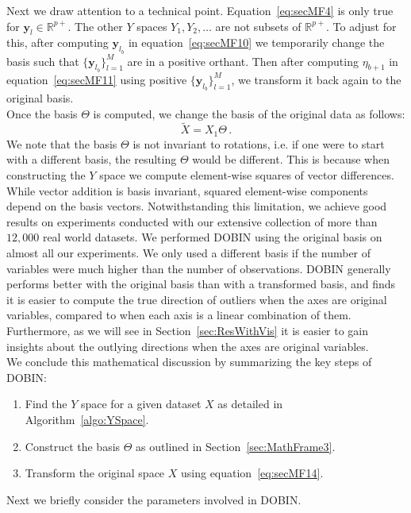 \documentclass[11pt]{article}
\begin{document}
Next we draw attention to a technical point. Equation~\ref{eq:secMF4} is only true for  $\bm{y}_l \in \mathbb{R}^{p+}$. The other $Y$ spaces $Y_1, Y_2, \ldots $ are not  subsets of $\mathbb{R}^{p+}$. To adjust for this, after computing  $\bm{y}_{l_{b}}$ in equation~\eqref{eq:secMF10} we temporarily change the basis such that  $\{ \bm{y}_{l_{b}}\}_{l=1}^M$ are in a positive orthant.  Then after computing  $\eta_{b+1}$ in equation~\eqref{eq:secMF11} using positive $\{ \bm{y}_{l_{b}}\}_{l=1}^M$,  we transform it back again to the original basis.  \\

Once the basis $\Theta$  is computed, we  change the basis of the original data as follows:
\begin{equation}\label{eq:secMF14}
    \tilde{X} = X_1 \Theta \, .
\end{equation}
We note that the basis $\Theta$ is not invariant to rotations, i.e. if one were to start with a different basis, the resulting $\Theta$ would be different. This is because when constructing the $Y$ space we compute element-wise squares of vector differences. While vector addition is basis invariant, squared element-wise components depend on the basis vectors. Notwithstanding this limitation, we achieve good results on experiments conducted with our extensive collection of more than $12,000$ real world datasets. We performed DOBIN using the original basis on almost all our experiments. We only used a different basis if the number of variables  were much higher than the number of observations.  DOBIN generally performs better with the original basis than with a transformed basis, and finds it  is easier to compute the true direction of outliers when the axes are original variables, compared to when each axis is a linear combination of them. Furthermore, as we will see in Section~\ref{sec:ResWithVis} it is easier to gain insights about the outlying directions when the axes are original variables. \\

We conclude this mathematical discussion by summarizing the key steps of DOBIN:
\begin{enumerate}
    \item Find the $Y$ space for a given dataset $X$ as detailed in Algorithm~\ref{algo:YSpace}.
    \item Construct the basis $\Theta$ as outlined in Section~\ref{sec:MathFrame3}. 
    \item Transform the original space $X$ using equation~\eqref{eq:secMF14}.
\end{enumerate}
Next we briefly consider the parameters involved in DOBIN. 
\end{document}
